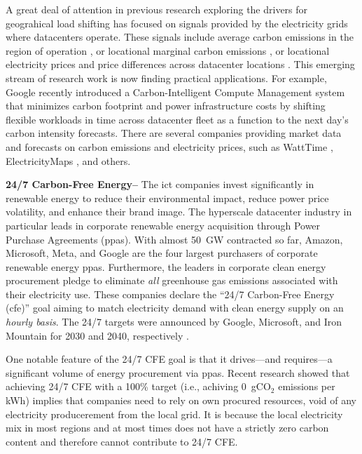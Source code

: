 A great deal of attention in previous research exploring the drivers for geograhical load shifting has focused on signals provided by the electricity grids where datacenters operate. These signals include average carbon emissions in the region of operation \cite{zhengMitigatingCurtailmentCarbon2020}, or locational marginal carbon emissions \cite{lindbergEnvironmentalPotentialHyperScale2021}, or locational electricity prices and price differences across datacenter locations \cite{raoMinimizingElectricityCost2010,tranHowGeoDistributedData2016, zhangRemuneratingSpaceTime2022}. This emerging stream of research work is now finding practical applications. For example, Google recently introduced a Carbon-Intelligent Compute Management system that minimizes carbon footprint and power infrastructure costs by shifting flexible workloads in time  across datacenter fleet as a function to the next day's carbon intensity forecasts. \cite{radovanovicIEEE2023} There are several companies providing market data and forecasts on carbon emissions and electricity prices, such as WattTime \cite{WattTime}, ElectricityMaps \cite{ElectricityMaps}, and others.

\textbf{24/7 Carbon-Free Energy--} The \gls{ict} companies invest significantly in renewable energy to reduce their environmental impact, reduce power price volatility, and enhance their brand image. The hyperscale datacenter industry in particular leads in corporate renewable energy acquisition through Power Purchase Agreements (\gls{ppa}s). With almost 50~GW contracted so far, Amazon, Microsoft, Meta, and Google are the four largest purchasers of corporate renewable energy \gls{ppa}s. \cite{ieaDataCentresData2023} Furthermore, the leaders in corporate clean energy procurement pledge to eliminate \textit{all} greenhouse gas emissions associated with their electricity use. These companies declare the \enquote{24/7 Carbon-Free Energy (\gls{cfe})} goal aiming to match electricity demand with clean energy supply on an \textit{hourly basis}. The 24/7 targets were announced by Google, Microsoft, and Iron Mountain for 2030 and 2040, respectively \cite{google-247by2030, Microsoft-vision, IronMountainSustainability}.

One notable feature of the 24/7 CFE goal is that it drives---and requires---a significant volume of energy procurement via \gls{ppa}s. Recent research showed that achieving 24/7 CFE with a 100\% target (i.e., achiving 0~gCO$_2$ emissions per kWh) implies that companies need to rely on own procured resources, void of any electricity producerement from the local grid. \cite{riepinMeansCostsSystemlevel2023, riepin-zenodo-systemlevel247} It is because the local electricity mix in most regions and at most times does not have a strictly zero carbon content and therefore cannot contribute to 24/7 CFE.

